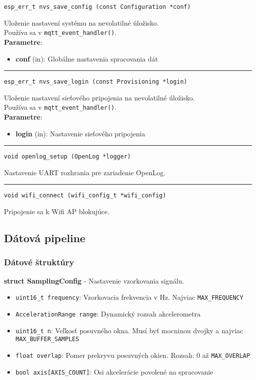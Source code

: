 \begin{lstlisting}[style=docs]
esp_err_t nvs_save_config (const Configuration *conf)
\end{lstlisting}
   Uloženie nastavení systému na nevolatilné úložisko. \\ Používa sa v \verb|mqtt_event_handler()|. \\
\textbf{Parametre}:
\begin{itemize}[noitemsep, topsep=0pt]
	\item \textbf{conf} (in): Globálne nastavenia spracovania dát
\end{itemize}
\bigbreak
\hrule

\begin{lstlisting}[style=docs]
esp_err_t nvs_save_login (const Provisioning *login)
\end{lstlisting}
   Uloženie nastavení sieťového pripojenia na nevolatilné úložisko. \\ Používa sa v \verb|mqtt_event_handler()|. \\
\textbf{Parametre}:
\begin{itemize}[noitemsep, topsep=0pt]
	\item \textbf{login} (in): Nastavenie sieťového pripojenia 
\end{itemize}
\bigbreak
\hrule

\begin{lstlisting}[style=docs]
void openlog_setup (OpenLog *logger)
\end{lstlisting}
Nastavenie UART rozhrania pre zariadenie OpenLog.
\bigbreak
\hrule

\begin{lstlisting}[style=docs]
void wifi_connect (wifi_config_t *wifi_config)
\end{lstlisting}
Pripojenie sa k Wifi AP blokujúce.


\subsection{Dátová pipeline} \label{modules:pipeline}

\subsubsection*{Dátové štruktúry}
\noindent\textbf{struct SamplingConfig} - Nastavenie vzorkovania signálu.
\begin{itemize}[noitemsep, topsep=0pt]
	\item \verb|uint16_t frequency|: Vzorkovacia frekvencia v Hz. Najviac \verb|MAX_FREQUENCY|
	\item \verb|AccelerationRange range|: Dynamický rozsah akcelerometra
	\item \verb|uint16_t n|: Veľkosť posuvného okna. Musí byť mocninou dvojky a najviac \verb|MAX_BUFFER_SAMPLES|
	\item \verb|float overlap|: Pomer prekryvu posuvných okien. Rozsah: 0 až \verb|MAX_OVERLAP|
	\item \verb|bool axis[AXIS_COUNT]|: Osi akcelerácie povolené na spracovanie
\end{itemize}
\bigbreak

